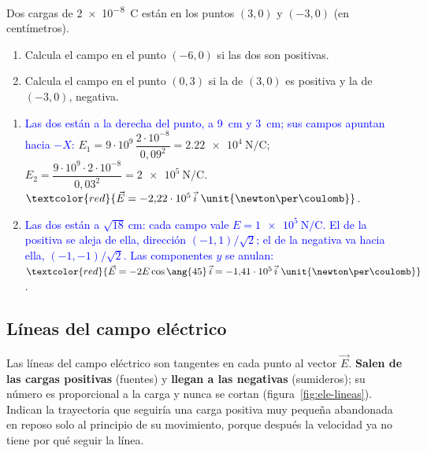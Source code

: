 \begin{exercise}
    Dos cargas de \qty{2e-8}{\coulomb} están en los puntos \((3, 0)\) y \((-3, 0)\) (en centímetros).
    \begin{enumerate}[label=\letraminuscula]
        \item Calcula el campo en el punto \((-6, 0)\) si las dos son positivas.
        \item Calcula el campo en el punto \((0, 3)\) si la de \((3, 0)\) es positiva y la de \((-3, 0)\), negativa.
    \end{enumerate}
    \begin{solu}
        \begin{enumerate}[label=\letraminuscula]
            \item \textcolor{blue}{Las dos están a la derecha del punto, a \qty{9}{\cm} y \qty{3}{\cm}; sus campos apuntan hacia \(-X\):}
            \(E_1 = 9\cdot 10^9\,\dfrac{2\cdot 10^{-8}}{0{,}09^2} = \qty{2.22e4}{\newton\per\coulomb}\);
            \(E_2 = \dfrac{9\cdot 10^9\cdot 2\cdot 10^{-8}}{0{,}03^2} = \qty{2e5}{\newton\per\coulomb}\).
            \(\textcolor{red}{\vec E = -2{,}22\cdot 10^5\,\vec{i}\ \unit{\newton\per\coulomb}}\).
            \item \textcolor{blue}{Las dos están a \(\sqrt{18}\ \unit{\cm}\): cada campo vale \(E = \qty{1e5}{\newton\per\coulomb}\). El de la
            positiva se aleja de ella, dirección \((-1, 1)/\sqrt 2\); el de la negativa va hacia ella, \((-1, -1)/\sqrt 2\). Las
            componentes \(y\) se anulan:}
            \(\textcolor{red}{\vec E = -2E\cos\ang{45}\,\vec{i} = -1{,}41\cdot 10^5\,\vec{i}\ \unit{\newton\per\coulomb}}\).
        \end{enumerate}
    \end{solu}
\end{exercise}

\subsection{Líneas del campo eléctrico}\label{subsec:ele-lineas}

Las líneas del campo eléctrico son tangentes en cada punto al vector \(\vec E\). \textbf{Salen de las cargas positivas}
(fuentes) y \textbf{llegan a las negativas} (sumideros); su número es proporcional a la carga y nunca se cortan
(figura~\ref{fig:ele-lineas}). Indican la trayectoria que seguiría una carga positiva muy pequeña abandonada en reposo solo
al principio de su movimiento, porque después la velocidad ya no tiene por qué seguir la línea.

